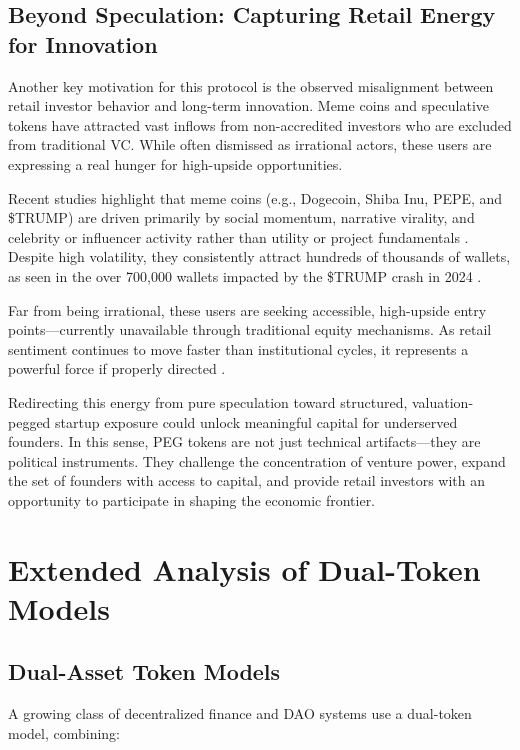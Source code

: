 \documentclass[conference]{IEEEtran}
\begin{document}
\subsection{Beyond Speculation: Capturing Retail Energy for Innovation}

Another key motivation for this protocol is the observed misalignment between retail investor behavior and long-term innovation. Meme coins and speculative tokens have attracted vast inflows from non-accredited investors who are excluded from traditional VC. While often dismissed as irrational actors, these users are expressing a real hunger for high-upside opportunities.

Recent studies highlight that meme coins (e.g., Dogecoin, Shiba Inu, PEPE, and \$TRUMP) are driven primarily by social momentum, narrative virality, and celebrity or influencer activity rather than utility or project fundamentals \cite{ssrn4891841, rutgers2023meme}. Despite high volatility, they consistently attract hundreds of thousands of wallets, as seen in the over 700,000 wallets impacted by the \$TRUMP crash in 2024 \cite{wikipediaTrump}.

Far from being irrational, these users are seeking accessible, high-upside entry points—currently unavailable through traditional equity mechanisms. As retail sentiment continues to move faster than institutional cycles, it represents a powerful force if properly directed \cite{marketwatch2022retail, arxiv2104.01847}.

Redirecting this energy from pure speculation toward structured, valuation-pegged startup exposure could unlock meaningful capital for underserved founders. In this sense, PEG tokens are not just technical artifacts—they are political instruments. They challenge the concentration of venture power, expand the set of founders with access to capital, and provide retail investors with an opportunity to participate in shaping the economic frontier.


\section{Extended Analysis of Dual-Token Models}

\subsection{Dual-Asset Token Models}

A growing class of decentralized finance and DAO systems use a dual-token model, combining:
\end{document}

